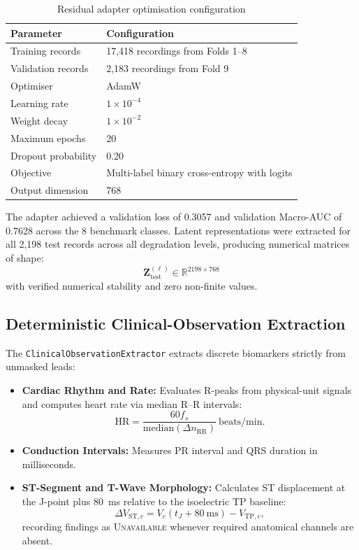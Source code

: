 \documentclass{ssnreview}
\begin{document}
\begin{table}[H]
  \centering
  \small
  \caption{Residual adapter optimisation configuration}
  \label{tab:adapter-config}
  \begin{tabular}{@{}ll@{}}
    \toprule
    \textbf{Parameter} & \textbf{Configuration} \\
    \midrule
    Training records & 17,418 recordings from Folds 1--8 \\
    Validation records & 2,183 recordings from Fold 9 \\
    Optimiser & AdamW \\
    Learning rate & $1\times 10^{-4}$ \\
    Weight decay & $1\times 10^{-2}$ \\
    Maximum epochs & 20 \\
    Dropout probability & 0.20 \\
    Objective & Multi-label binary cross-entropy with logits \\
    Output dimension & 768 \\
    \bottomrule
  \end{tabular}
\end{table}

The adapter achieved a validation loss of 0.3057 and validation Macro-AUC of 0.7628 across the
8 benchmark classes. Latent representations were extracted for all 2,198 test records across
all degradation levels, producing numerical matrices of shape:
\begin{equation}
  \mathbf{Z}_{\mathrm{test}}^{(\ell)} \in \mathbb{R}^{2198\times 768}
\end{equation}
with verified numerical stability and zero non-finite values.

\subsection{Deterministic Clinical-Observation Extraction}

The \texttt{ClinicalObservationExtractor} extracts discrete biomarkers strictly from unmasked
leads:
\begin{itemize}
  \item \textbf{Cardiac Rhythm and Rate:} Evaluates R-peaks from physical-unit signals and computes
  heart rate via median R--R intervals:
  \begin{equation}
    \mathrm{HR} = \frac{60f_s}{\mathrm{median}(\Delta n_{\mathrm{RR}})}\ \mathrm{beats/min}.
  \end{equation}
  \item \textbf{Conduction Intervals:} Measures PR interval and QRS duration in milliseconds.
  \item \textbf{ST-Segment and T-Wave Morphology:} Calculates ST displacement at the J-point plus
  80~ms relative to the isoelectric TP baseline:
  \begin{equation}
    \Delta V_{\mathrm{ST},c} = V_c(t_J + 80\ \mathrm{ms}) - V_{\mathrm{TP},c},
  \end{equation}
  recording findings as \textsc{Unavailable} whenever required anatomical channels are absent.
\end{itemize}
\end{document}
